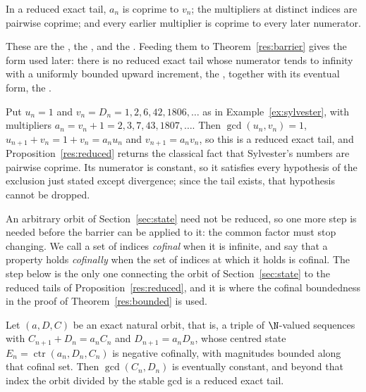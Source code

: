 \documentclass[11pt]{article}
\newcommand{\ctr}{\operatorname{ctr}}
\begin{document}
\begin{proposition}\label{res:reduced}
In a reduced exact tail, $a_n$ is coprime to $v_n$; the multipliers at distinct
indices are pairwise coprime; and every earlier multiplier is coprime to every
later numerator.
\end{proposition}

\noindent These are the
, the
, and the
.  Feeding them to Theorem~\ref{res:barrier} gives the form used
later: there is no reduced exact tail whose numerator tends to infinity with a
uniformly bounded upward increment, the
, together with its eventual form, the
.

\begin{example}\label{ex:reduced}
Put $u_n=1$ and $v_n=D_n=1,2,6,42,1806,\ldots$ as in
Example~\ref{ex:sylvester}, with multipliers $a_n=v_n+1=2,3,7,43,1807,\ldots$.
Then $\gcd(u_n,v_n)=1$, $u_{n+1}+v_n=1+v_n=a_nu_n$ and $v_{n+1}=a_nv_n$, so
this is a reduced exact tail, and Proposition~\ref{res:reduced} returns the
classical fact that Sylvester's numbers are pairwise coprime.  Its numerator is
constant, so it satisfies every hypothesis of the exclusion just stated except
divergence; since the tail exists, that hypothesis cannot be dropped.
\end{example}

An arbitrary orbit of Section~\ref{sec:state} need not be reduced, so one more step is needed
before the barrier can be applied to it: the common factor must stop changing.
We call a set of indices \emph{cofinal} when it is infinite, and say that a
property holds \emph{cofinally} when the set of indices at which it holds is
cofinal.  The step below is the only one connecting the orbit of
Section~\ref{sec:state} to the reduced tails of
Proposition~\ref{res:reduced}, and it is where the cofinal boundedness in the
proof of Theorem~\ref{res:bounded} is used.

\begin{proposition}\label{res:gcdstab}
Let $(a,D,C)$ be an exact natural orbit, that is, a triple of $\N$-valued
sequences with $C_{n+1}+D_n=a_nC_n$ and $D_{n+1}=a_nD_n$, whose centred state
$E_n=\ctr(a_n,D_n,C_n)$ is negative cofinally, with magnitudes bounded along
that cofinal set.  Then
$\gcd(C_n,D_n)$ is eventually constant, and beyond that index the orbit divided
by the stable gcd is a reduced exact tail.
\end{proposition}
\end{document}

